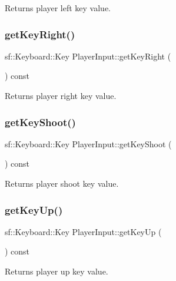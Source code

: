 Returns player left key value. \hypertarget{classPlayerInput_aa046d257f45b62228d6de973d120f391}{}\label{classPlayerInput_aa046d257f45b62228d6de973d120f391} 
\subsubsection{\texorpdfstring{get\+Key\+Right()}{getKeyRight()}}
{\footnotesize\ttfamily sf\+::\+Keyboard\+::\+Key Player\+Input\+::get\+Key\+Right (\begin{DoxyParamCaption}{ }\end{DoxyParamCaption}) const}

Returns player right key value. \hypertarget{classPlayerInput_aa63de3b5eb312b8e5be58dc3b9ef8648}{}\label{classPlayerInput_aa63de3b5eb312b8e5be58dc3b9ef8648} 
\subsubsection{\texorpdfstring{get\+Key\+Shoot()}{getKeyShoot()}}
{\footnotesize\ttfamily sf\+::\+Keyboard\+::\+Key Player\+Input\+::get\+Key\+Shoot (\begin{DoxyParamCaption}{ }\end{DoxyParamCaption}) const}

Returns player shoot key value. \hypertarget{classPlayerInput_a349bd5b6c64f170e88b409f2ce5384f3}{}\label{classPlayerInput_a349bd5b6c64f170e88b409f2ce5384f3} 
\subsubsection{\texorpdfstring{get\+Key\+Up()}{getKeyUp()}}
{\footnotesize\ttfamily sf\+::\+Keyboard\+::\+Key Player\+Input\+::get\+Key\+Up (\begin{DoxyParamCaption}{ }\end{DoxyParamCaption}) const}

Returns player up key value. \hypertarget{classPlayerInput_a7b1446e7877945b3361ea2775b182725}{}\label{classPlayerInput_a7b1446e7877945b3361ea2775b182725} 

